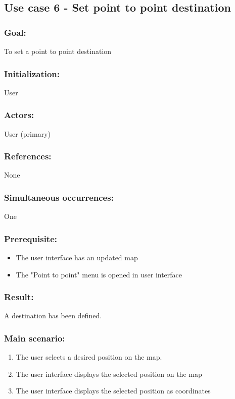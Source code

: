 \begin{framed}
	\subsection{Use case 6 - Set point to point destination}
	\subsubsection*{Goal:}
	To set a point to point destination
	
	\subsubsection*{Initialization:}
	User
	
	\subsubsection*{Actors:}
	User (primary)
	
	\subsubsection*{References:}
	None
	
	\subsubsection*{Simultaneous occurrences:}
	One
	
	\subsubsection*{Prerequisite:}
	\begin{itemize}
		\item The user interface has an updated map
		\item The "Point to point" menu is opened in user interface
	\end{itemize}

	\subsubsection*{Result:}
	A destination has been defined.
	
	\subsubsection*{Main scenario:}
	\begin{enumerate}
		\item The user selects a desired position on the map.
		\item \label{uc4.2} The user interface displays the selected position on the map
		\item The user interface displays the selected position as coordinates
	\end{enumerate}	


\end{framed}
